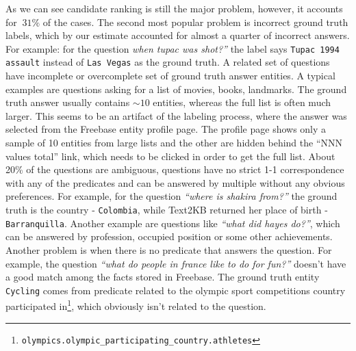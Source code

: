 As we can see candidate ranking is still the major problem, however, it accounts for $~31\%$ of the cases.
The second most popular problem is incorrect ground truth labels, which by our estimate accounted for almost a quarter of incorrect answers.
For example: for the question \textit{when tupac was shot?''} the label says \texttt{Tupac 1994 assault} instead of \texttt{Las Vegas} as the ground truth.
A related set of questions have incomplete or overcomplete set of ground truth answer entities.
A typical examples are questions asking for a list of movies, books, landmarks.
The ground truth answer usually contains $\sim10$ entities, whereas the full list is often much larger.
This seems to be an artifact of the labeling process, where the answer was selected from the Freebase entity profile page.
The profile page shows only a sample of 10 entities from large lists and the other are hidden behind the ``NNN values total'' link, which needs to be clicked in order to get the full list.
About 20\% of the questions are ambiguous, \ie questions have no strict 1-1 correspondence with any of the predicates and can be answered by multiple without any obvious preferences.
For example, for the question \textit{``where is shakira from?''} the ground truth is the country - \texttt{Colombia}, while Text2KB returned her place of birth - \texttt{Barranquilla}.
Another example are questions like \textit{``what did hayes do?''}, which can be answered by profession, occupied position or some other achievements.
Another problem is when there is no predicate that answers the question.
For example, the question \textit{``what do people in france like to do for fun?''} doesn't have a good match among the facts stored in Freebase.
The ground truth entity \texttt{Cycling} comes from predicate related to the olympic sport competitions country participated in\footnote{\texttt{olympics.olympic\_participating\_country.athletes}}, which obviously isn't related to the question.


